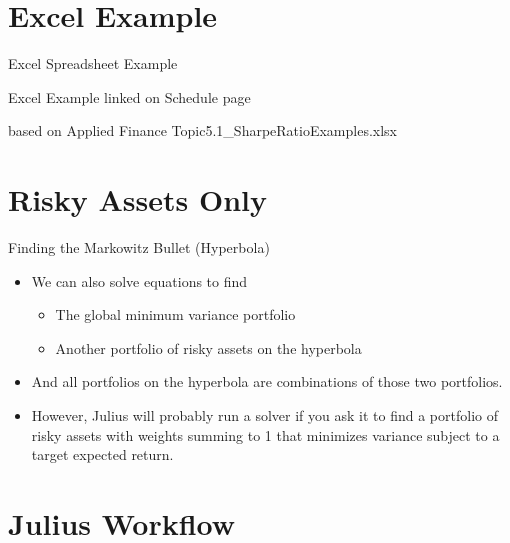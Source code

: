 \documentclass[10pt]{beamer}
\begin{document}
\section{Excel Example}

\begin{frame}{Excel Spreadsheet Example}

Excel Example linked on Schedule page

based on Applied Finance Topic5.1\_SharpeRatioExamples.xlsx
\end{frame}

\section{Risky Assets Only}

\begin{frame}{Finding the Markowitz Bullet (Hyperbola)}
\begin{itemize}
\item We can also solve equations to find
\begin{itemize}
\item The global minimum variance portfolio
\item Another portfolio of risky assets on the hyperbola
\end{itemize}
\item And all portfolios on the hyperbola are combinations of those two portfolios.
\item However, Julius will probably run a solver if you ask it to find a portfolio of risky assets with weights summing to 1 that minimizes variance subject to a target expected return.
\end{itemize}
\end{frame}

\section{Julius Workflow}
\end{document}
